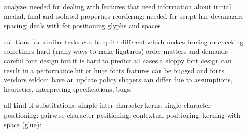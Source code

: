 \startchapter[title=Related]

\startitemize
    \startitem
        analyze: needed for dealing with features that need information about
        initial, medial, final and isolated properties
    \stopitem
    \startitem
        reordering: needed for script like devanagari
    \stopitem
    \startitem
        spacing: deals with for positioning glyphs and spaces
    \stopitem
\stopitemize

\stopchapter

\startchapter[title=Pitfalls]

\startitemize
    \startitem
        solutions for similar tasks can be quite different which makes tracing
        or checking sometimes hard (many ways to make ligatures)
    \stopitem
    \startitem
        order matters and demands careful font design but it is hard to predict
        all cases
    \stopitem
    \startitem
        a sloppy font design can result in a performance hit or huge fonts
    \stopitem
    \startitem
        features can be bugged and fonts vendors seldom have an update policy
    \stopitem
    \startitem
        shapers can differ due to assumptions, heuristics, interpreting
        specifications, bugs, \unknown
    \stopitem
\stopitemize

\stopchapter

\startchapter[title=Examples]
    \startitem
        all kind of substitutions: 
    \stopitem
    \startitem
        simple inter character kerns: 
    \stopitem
    \startitem
        single character positioning: 
    \stopitem
    \startitem
        pairwise character positioning: 
    \stopitem
    \startitem
        contextual positioning: 
    \stopitem
    \startitem
        kerning with space (glue): 
    \stopitem
\startitemize

\stopitemize

\stopchapter

\stopdocument
